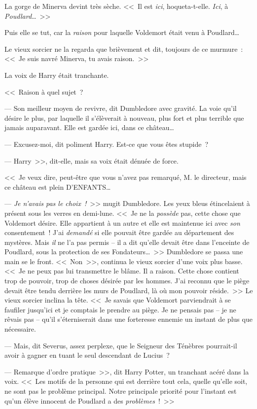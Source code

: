 La gorge de Minerva devint très sèche. <<~Il est \emph{ici}, hoqueta-t-elle. \emph{Ici}, à \emph{Poudlard}…~>>

Puis elle se tut, car la \emph{raison} pour laquelle Voldemort était venu à Poudlard…

Le vieux sorcier ne la regarda que brièvement et dit, toujours de ce murmure~: <<~Je suis navré Minerva, tu avais raison.~>>

La voix de Harry était tranchante.

<<~Raison à quel sujet~?

--- Son meilleur moyen de revivre, dit Dumbledore avec gravité. La voie qu'il désire le plus, par laquelle il s'élèverait à nouveau, plus fort et plus terrible que jamais auparavant. Elle est gardée ici, dans ce château…

--- Excusez-moi, dit poliment Harry. Est-ce que vous êtes stupide~?

--- Harry~>>, dit-elle, mais sa voix était dénuée de force.

<<~Je veux dire, peut-être que vous n'avez pas remarqué, M. le directeur, mais ce château est plein D'ENFANTS…

--- \emph{Je n'avais pas le choix~!}~>> mugit Dumbledore. Les yeux bleus étincelaient à présent sous les verres en demi-lune. <<~Je ne la \emph{possède} pas, cette chose que Voldemort désire. Elle appartient à un autre et elle est maintenue ici avec \emph{son} consentement~! J'ai \emph{demandé} si elle pouvait être gardée au département des mystères. Mais \emph{il} ne l'a pas permis -- il a dit qu'elle devait être dans l'enceinte de Poudlard, sous la protection de ses Fondateurs…~>> Dumbledore se passa une main se le front. <<~Non~>>, continua le vieux sorcier d'une voix plus basse. <<~Je ne peux pas lui transmettre le blâme. Il a raison. Cette chose contient trop de pouvoir, trop de choses désirée par les hommes. J'ai reconnu que le piège devait être tendu derrière les murs de Poudlard, là où mon pouvoir réside.~>> Le vieux sorcier inclina la tête. <<~Je savais que Voldemort parviendrait à se faufiler jusqu'ici et je comptais le prendre au piège. Je ne pensais pas -- je ne rêvais pas -- qu'il s'éterniserait dans une forteresse ennemie un instant de plus que nécessaire.

--- Mais, dit Severus, assez perplexe, que le Seigneur des Ténèbres pourrait-il avoir à gagner en tuant le seul descendant de Lucius~?

--- Remarque d'ordre pratique~>>, dit Harry Potter, un tranchant acéré dans la voix. <<~Les motifs de la personne qui est derrière tout cela, quelle qu'elle soit, ne sont pas le problème principal. Notre principale priorité pour l'instant est qu'un élève innocent de Poudlard a des \emph{problèmes}~!~>>

